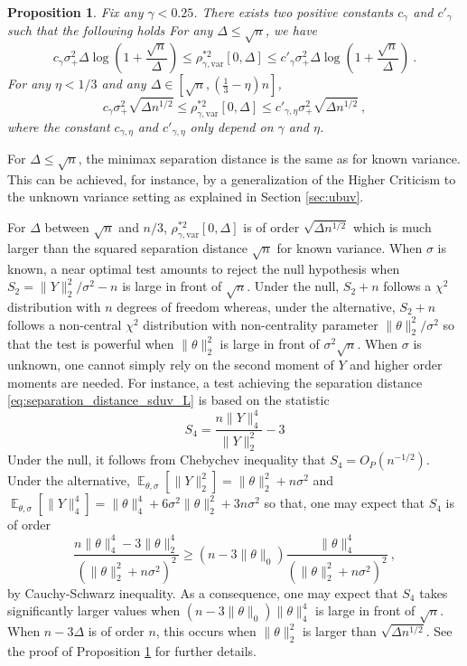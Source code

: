 \documentclass[twoside,11pt]{article}
\newtheorem{prp}{Proposition}
\def\beq{\begin{equation}}
\def\eeq{\end{equation}}
\newcommand{\E}{\operatorname{\mathbb{E}}}
\newcommand{\<}{\langle}
\renewcommand{\>}{\rangle}
\begin{document}
\begin{prp}\label{prp:signal_detection_uv}
Fix any $\gamma<0.25$. There exists two positive constants $c_{\gamma}$ and $c'_{\gamma}$ such that the following holds
For any  $\Delta \leq \sqrt{n}$, we have
\beq\label{eq:separation_distance_sduv_S}
c_{\gamma}\sigma_+^2 \Delta \log(1 + \frac{\sqrt{n}}{\Delta}) \leq \rho_{\gamma,\mathrm{var}}^{*2}[0,\Delta] \leq c'_{\gamma} \sigma_+^2 \Delta \log(1 + \frac{\sqrt{n}}{\Delta})\ .
\eeq 
For any $\eta<1/3$ and any $\Delta \in [\sqrt{n}, (\tfrac{1}{3}-\eta)n]$,
\beq\label{eq:separation_distance_sduv_L}
c_{\gamma}\sigma_+^2 \sqrt{\Delta n^{1/2}} \leq \rho_{\gamma,\mathrm{var}}^{*2}[0,\Delta] \leq c'_{\gamma,\eta} \sigma_+^2 \sqrt{\Delta n^{1/2}}  \ ,
\eeq 
where the constant $c_{\gamma,\eta}$ and $c'_{\gamma,\eta}$ only depend on $\gamma$ and $\eta$. 
\end{prp}


For $\Delta\leq \sqrt{n}$, the minimax separation distance is the same as for known variance. This can be achieved, for instance, by a generalization of the Higher Criticism to the  unknown variance setting as explained in Section \ref{sec:ubuv}.

For $\Delta$ between $\sqrt{n}$ and $n/3$, $\rho_{\gamma,\mathrm{var}}^{*2}[0,\Delta]$ is of order $\sqrt{\Delta n^{1/2}}$ which is much larger than the squared separation distance $\sqrt{n}$ for known variance. 
When $\sigma$ is known, a near optimal test amounts to reject the null hypothesis when $S_2=\|Y\|_2^2/\sigma^2-n$ is large in front of $\sqrt{n}$. Under the null, $S_2+n$ follows a $\chi^2$ distribution with $n$ degrees of freedom whereas, under the alternative, $S_2+n$ follows a non-central $\chi^2$ distribution with non-centrality parameter $\|\theta\|_2^2/\sigma^2$ so that the test is powerful when $\|\theta\|_2^2$ is large in front of $\sigma^2 \sqrt{n}$. When $\sigma$ is unknown, one cannot simply rely on the second moment of $Y$ and higher order moments are needed. For instance, a test achieving the separation distance \eqref{eq:separation_distance_sduv_L} is based on the statistic
\beq\label{eq:definition_S4}
 S_4 = \frac{n\|Y\|_4^4}{\|Y\|_2^2}-3
\eeq
Under the null, it follows from Chebychev inequality that $S_4=  O_P(n^{-1/2})$. Under the alternative, $\E_{\theta,\sigma}[\|Y\|_2^2]= \|\theta\|_2^2 +  n\sigma^2 $ and $\E_{\theta,\sigma}[\|Y\|_4^4]= \|\theta\|_4^4 + 6 \sigma^2 \|\theta\|_2^2+ 3n\sigma^2$ so that, one may expect that $S_4$ is of order 
\[\frac{n\|\theta\|_4^4 - 3\|\theta\|_2^4}{(\|\theta\|_2^2+ n\sigma^2)^2}\geq  (n-3\|\theta\|_0) \frac{\|\theta\|_4^4}{(\|\theta\|_2^2+ n\sigma^2)^2}\ , \]
by Cauchy-Schwarz inequality. As a consequence, one may expect that $S_4$ takes significantly larger values when $(n- 3\|\theta\|_0)\|\theta\|_4^4$ is large in front of $\sqrt{n}$. When $n-3\Delta$ is of order $n$, this occurs when $\|\theta\|_2^2$ is larger than $\sqrt{\Delta n^{1/2}}$.  See  the proof of Proposition \ref{prp:signal_detection_uv} for further details.
\end{document}

